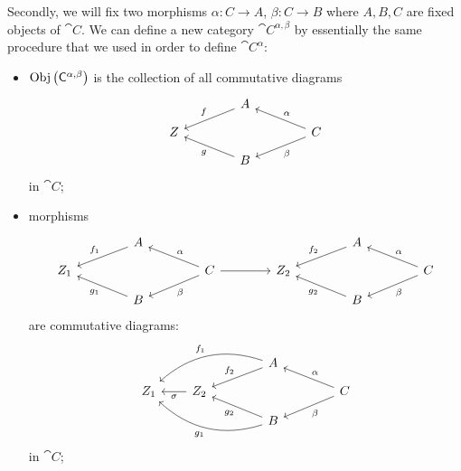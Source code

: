 {    Secondly, we will fix two morphisms $\alpha : C \to A$, $\beta : C \to B$ where $A,B,C$ are fixed objects of $\cat{C}$. We can define a new category $\cat{C}^{\alpha,\beta}$ by essentially the same procedure that we used in order to define $\cat{C}^\alpha$:
    \begin{itemize}[label=$\bullet$]
        \item $\mathrm{Obj} \left( \mathsf{C}^{\alpha,\beta} \right)$ is the collection of all commutative diagrams
        \[\begin{tikzcd}[row sep=0.8em,column sep=2em,ampersand replacement=\&]
            \&\& A \ar[dll, swap, "f"] \\
            Z \&\&\&\& C \ar[dll, "\beta"] \ar[ull, swap, "\alpha"]\\
            \&\& B \ar[ull, "g"]
        \end{tikzcd}\]
        in $\cat{C}$;

        \item morphisms
        \[\begin{tikzcd}[row sep=0.8em,column sep=2em,ampersand replacement=\&]
            \&\& A \ar[dll, swap, "f_1"] \&\& \&\& \&\& A \ar[dll, swap, "f_2"]\\
            Z_1 \&\&\&\& C \ar[dll, "\beta"] \ar[ull, swap, "\alpha"] \ar[rr] \&\& Z_2 \&\&\&\& C \ar[dll, "\beta"] \ar[ull, swap, "\alpha"] \\
            \&\& B \ar[ull, "g_1"] \&\& \&\& \&\& B \ar[ull, "g_2"]
        \end{tikzcd}\]
        are commutative diagrams:
        \[\begin{tikzcd}[row sep=0.8em,column sep=2em,ampersand replacement=\&]
            \& \&\& A \ar[dll, swap, "f_2"] \ar[dlll, swap, bend right, "f_1"] \\
            Z_1 \& Z_2 \ar[l, "\sigma"] \&\&\&\& C \ar[dll, "\beta"] \ar[ull, swap, "\alpha"]\\
            \& \&\& B \ar[ull, "g_2"] \ar[ulll, bend left, "g_1"]
        \end{tikzcd}\]
        in $\cat{C}$;


\end{itemize}}
